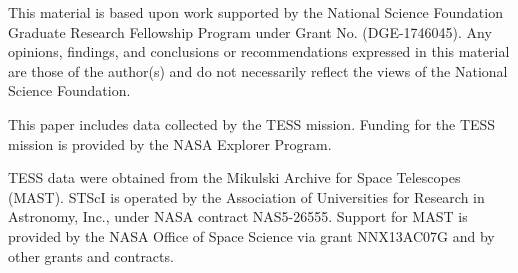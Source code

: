 \documentclass[twocolumn]{aastex62}
\begin{document}
This material is based upon work supported by the National Science Foundation Graduate Research Fellowship Program under Grant No. (DGE-1746045). Any opinions, findings, and conclusions or recommendations expressed in this material are those of the author(s) and do not necessarily reflect the views of the National Science Foundation.



This paper includes data collected by the TESS mission. Funding for the TESS mission is provided by the NASA Explorer Program.

TESS data were obtained from the Mikulski Archive for Space Telescopes
(MAST).
STScI is operated by the Association of Universities for Research in
Astronomy, Inc., under NASA contract NAS5-26555.
Support for MAST is provided by the NASA Office of Space Science via grant
NNX13AC07G and by other grants and contracts.










\end{document}
